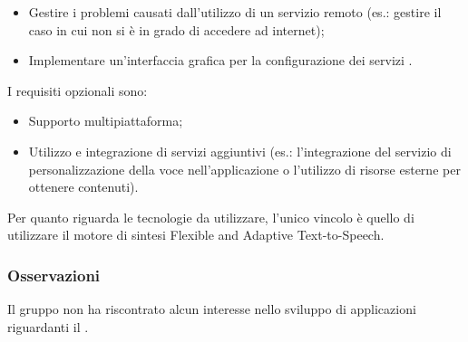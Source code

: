 \begin{itemize}
	\item Gestire i problemi causati dall'utilizzo di un servizio remoto (es.: gestire il caso in cui non si è in grado di accedere ad internet);
	\item Implementare un'interfaccia grafica per la configurazione dei servizi .
\end{itemize}

I requisiti opzionali sono:

\begin{itemize}
	\item Supporto multipiattaforma;
	\item Utilizzo e integrazione di servizi aggiuntivi (es.: l'integrazione del servizio di personalizzazione
	della voce nell'applicazione o l'utilizzo di risorse esterne per ottenere contenuti).
\end{itemize}

Per quanto riguarda le tecnologie da utilizzare, l'unico vincolo è quello di utilizzare il motore di sintesi Flexible and Adaptive Text-to-Speech.

\subsubsection{Osservazioni}
Il gruppo non ha riscontrato alcun interesse nello sviluppo di applicazioni riguardanti il .
